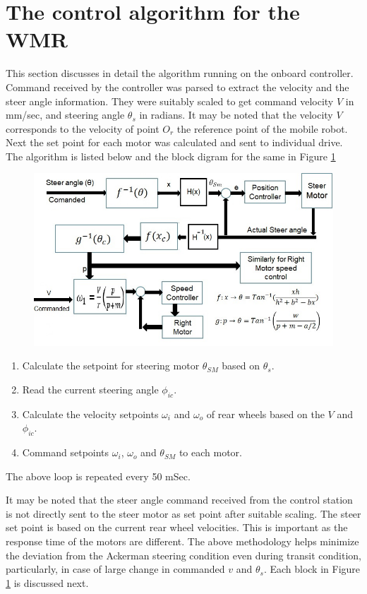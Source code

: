\section{The control algorithm for the WMR}
This section discusses in detail the algorithm running on the onboard controller.  Command received by the controller was parsed to extract the velocity  and the steer angle  information. They were suitably scaled to get command velocity  $V$ in mm/sec, and steering  angle $\theta_s$ in radians.  It may be noted that the velocity $V$ corresponds to the velocity of point $O_r$ the reference point of the mobile robot.  Next the set point for each motor was calculated  and sent to individual drive. The algorithm is listed below and the block digram for the same in Figure \ref{fig:ControlBlock}
\begin{figure}[h]
	\includegraphics[width=\linewidth,keepaspectratio]{Chapter5/fig/BlkDigLocal2}
	\label{fig:ControlBlock} 
\end{figure}

\begin{enumerate}
	\item Calculate the setpoint for steering motor $\theta_{SM} $ based on $\theta_s$.
	\item Read the current steering  angle $\phi_{ic}$.
	\item Calculate the velocity setpoints $\omega_{i}$ and $\omega_{o}$ of  rear wheels based on the $V$ and $\phi_{ic}$.

	
	\item Command  setpoints $\omega_{i}$, $\omega_{o}$ and $\theta_{SM} $ to each motor. 
\end{enumerate}
The above loop is repeated every 50 mSec.

It may be noted that the steer angle command received from the control station is not directly sent to the steer motor as set point after suitable scaling. The steer set point is based on the current rear wheel velocities. This is important as the response time of the  motors are different. The above methodology helps  minimize the deviation  from the Ackerman  steering condition even during transit condition, particularly, in case of large change in commanded $v$ and $\theta_s$. 
Each block in Figure \ref{fig:ControlBlock} is discussed next. 

